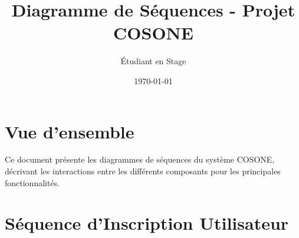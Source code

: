 \documentclass[12pt,a4paper]{article}
\title{\textbf{Diagramme de Séquences - Projet COSONE}}
\author{Étudiant en Stage}
\date{\today}
\begin{document}
\maketitle

\section{Vue d'ensemble}

Ce document présente les diagrammes de séquences du système COSONE, décrivant les interactions entre les différents composants pour les principales fonctionnalités.

\section{Séquence d'Inscription Utilisateur}
\end{document}
